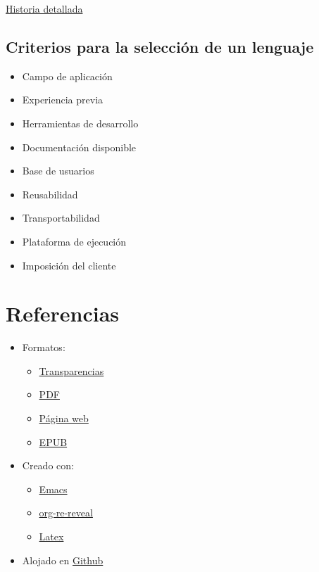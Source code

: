 \documentclass[a4paper]{article}
\begin{document}
\href{http://rigaux.org/language-study/diagram.png}{Historia detallada}
\subsection{Criterios para la selección de un lenguaje}
\label{criterios-para-la-selección-de-un-lenguaje}
\begin{itemize}
\item Campo de aplicación
\item Experiencia previa
\item Herramientas de desarrollo
\item Documentación disponible
\item Base de usuarios
\item Reusabilidad
\item Transportabilidad
\item Plataforma de ejecución
\item Imposición del cliente
\end{itemize}
\section{Referencias}
\label{sec:org0000018}
\label{}
\begin{itemize}
\item Formatos:
\begin{itemize}
\item \href{./ED-01-elementos-desarrollo-software.reveal.html}{Transparencias}
\item \href{./ED-01-elementos-desarrollo-software.pdf}{PDF}
\item \href{./ED-01-elementos-desarrollo-software.wp.html}{Página web}
\item \href{./ED-01-elementos-desarrollo-software.epub}{EPUB}
\end{itemize}
\item Creado con:
\begin{itemize}
\item \href{https://www.gnu.org/s/emacs/}{Emacs}
\item \href{https://gitlab.com/oer/org-re-reveal}{org-re-reveal}
\item \href{https://www.latex-project.org/}{Latex}
\end{itemize}
\item Alojado en \href{https://alvarogonzalezsotillo.github.io/apuntes-clase}{Github}
\end{itemize}
\end{document}
